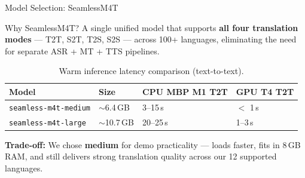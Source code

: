 \documentclass{beamer}
\begin{document}
\begin{frame}{Model Selection: SeamlessM4T}
    \begin{block}{Why SeamlessM4T?}
        A single unified model that supports \textbf{all four translation modes} --- T2T, S2T, T2S, S2S --- across 100+ languages, eliminating the need for separate ASR + MT + TTS pipelines.
    \end{block}

    \pause

    \begin{table}[]
        \footnotesize
        \begin{tabular}{@{}llll@{}}
        \toprule
        \textbf{Model} & \textbf{Size} & \textbf{CPU MBP M1 T2T} & \textbf{GPU T4 T2T} \\ \midrule
        \texttt{seamless-m4t-medium} & $\sim$6.4\,GB & 3--15\,s & $<$ 1\,s \\
        \texttt{seamless-m4t-large}  & $\sim$10.7\,GB & 20--25\,s & 1--3\,s \\
        \bottomrule
        \end{tabular}
        \caption{\footnotesize Warm inference latency comparison (text-to-text).}
    \end{table}

    \vspace{4pt}
    \textbf{Trade-off:} We chose \textbf{medium} for demo practicality --- loads faster, fits in 8\,GB RAM, and still delivers strong translation quality across our 12 supported languages.
\end{frame}
\end{document}
